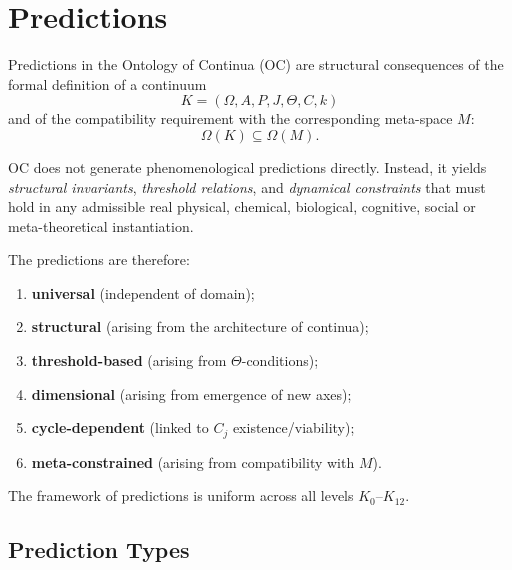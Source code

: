 

\section{Predictions}
\label{sec:predictions-master}

Predictions in the Ontology of Continua (OC) are structural consequences  
of the formal definition of a continuum
\[
K = (\Omega, A, P, J, \Theta, C, k)
\]
and of the compatibility requirement with the corresponding meta-space $M$:
\[
\Omega(K) \subseteq \Omega(M).
\]

OC does not generate phenomenological predictions directly.  
Instead, it yields \emph{structural invariants},  
\emph{threshold relations}, and \emph{dynamical constraints}  
that must hold in any admissible real physical, chemical, biological,  
cognitive, social or meta-theoretical instantiation.

The predictions are therefore:

\begin{enumerate}
    \item \textbf{universal} (independent of domain);
    \item \textbf{structural} (arising from the architecture of continua);
    \item \textbf{threshold-based} (arising from $\Theta$-conditions);
    \item \textbf{dimensional} (arising from emergence of new axes);
    \item \textbf{cycle-dependent} (linked to $C_j$ existence/viability);
    \item \textbf{meta-constrained} (arising from compatibility with $M$).
\end{enumerate}

The framework of predictions is uniform across all levels $K_0$–$K_{12}$.

\subsection{Prediction Types}

